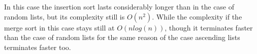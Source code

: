 \documentclass{article}
\begin{document}
In this case the insertion sort lasts considerably longer than in the case of random lists, but its complexity still is $O(n^2)$. While the complexity if the merge sort in this case stays still at $O(n log(n))$, though it terminates faster than the case of random lists for the same reason of the case ascending lists terminates faster too.
\end{document}
